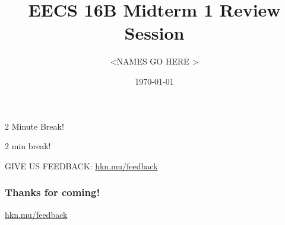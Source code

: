 

\title{EECS 16B Midterm 1 Review Session}
\author{ \textless NAMES GO HERE \textgreater }
\date{\today}

\newcommand{\SlideAccessingLogistics}{ \textless PIAZZA POST GOES HERE \textgreater }









\begin{frame}
    2 Minute Break!
\end{frame}




\begin{frame}
    2 min break!

      GIVE US FEEDBACK: \url{hkn.mu/feedback}
\end{frame}







\begin{frame}
    \frametitle{Thanks for coming!}
    \href{https://hkn.mu/feedback}{hkn.mu/feedback}
\end{frame}


